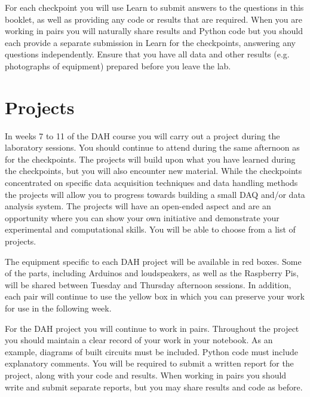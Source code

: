 For each checkpoint you will use Learn to submit answers to the questions in this booklet, as well as providing any code or results that are required.
When you are working in pairs you will naturally share results and Python code but you should each provide a separate submission in Learn for the checkpoints, answering any questions independently.
Ensure that you have all data and other results (e.g. photographs of equipment) prepared before you leave the lab.

\section{Projects}

In weeks 7 to 11 of the DAH course you will carry out a project during the laboratory sessions.
You should continue to attend during the same afternoon as for the checkpoints.
The projects will build upon what you have learned during the checkpoints, but you will also encounter new material.
While the checkpoints concentrated on specific data acquisition techniques and data handling methods the projects will allow you to progress towards building a small DAQ and/or data analysis system.
The projects will have an open-ended aspect and are an opportunity where you can show your own initiative and demonstrate your experimental and computational skills. 
You will be able to choose from a list of projects. %

The equipment specific to each DAH project will be available in red boxes.
Some of the parts, including Arduinos and loudspeakers, as well as the Raspberry Pis, will be shared between Tuesday and Thursday afternoon sessions.
In addition, each pair will continue to use the yellow box in which you can preserve your work for use in the following week. 

For the DAH project you will continue to work in pairs.
Throughout the project you should maintain a clear record of your work in your notebook.
As an example, diagrams of built circuits must be included.
Python code must include explanatory comments.
You will be required to submit a written report for the project, along with your code and results.
When working in pairs you should write and submit separate reports, but you may share results and code as before.

